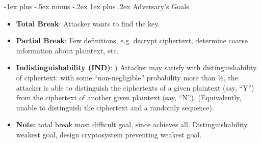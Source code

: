 \documentclass[10pt, landscape]{article}
\makeatletter
\renewcommand{\subsubsection}{\@startsection{subsubsection}{3}{0mm}%
                                {-1ex plus -.5ex minus -.2ex}%
                                {1ex plus .2ex}%
                                {\normalfont\small\bfseries}}
\makeatother
\begin{document}
\begin{multicols*}{3}
\subsubsection{Adversary's Goals}
\begin{itemize}
\item \textbf{Total Break}: Attacker wants to find the key.
\item \textbf{Partial Break}: Few definitions, e.g. decrypt ciphertext, determine coarse information about plaintext, etc.
\item \textbf{Indistinguishability (IND)}: ) Attacker may satisfy with distinguishability of ciphertext: with some “non-negligible” probability more than ½, the attacker is able to distinguish the ciphertexts of a given plaintext (say, “Y”) from the ciphertext of another given plaintext (say, “N”). (Equivalently, unable to distinguish the ciphertext and a randomly sequence).
\item \textbf{Note}: total break most difficult goal, since achieves all. Distinguishability weakest goal, design cryptosystem preventing weakest goal.
\end{itemize}


\end{multicols*}
\end{document}
